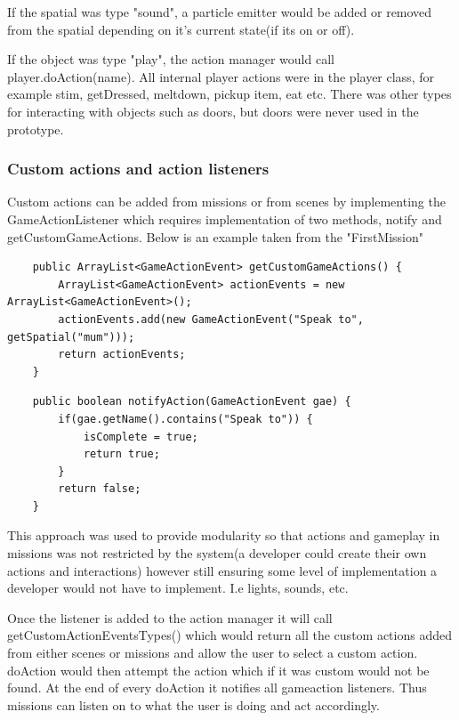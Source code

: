If the spatial was type "sound", a particle emitter would be added or removed from the spatial depending on it’s current state(if its on or off).

If the object was type "play", the action manager would call player.doAction(name). All internal player actions were in the player class, for example stim, getDressed, meltdown, pickup item, eat etc. There was other types for interacting with objects such as doors, but doors were never used in the prototype.

\subsubsection*{Custom actions and action listeners}
Custom actions can be added from missions or from scenes by implementing the GameActionListener which requires implementation of two methods, notify and getCustomGameActions. Below is an example taken from the "FirstMission"

\begin{lstlisting}
    public ArrayList<GameActionEvent> getCustomGameActions() {
        ArrayList<GameActionEvent> actionEvents = new ArrayList<GameActionEvent>();
        actionEvents.add(new GameActionEvent("Speak to", getSpatial("mum")));
        return actionEvents;
    }
\end{lstlisting}

\begin{lstlisting}
    public boolean notifyAction(GameActionEvent gae) {
        if(gae.getName().contains("Speak to")) {
            isComplete = true;
            return true;
        }
        return false;
    }
\end{lstlisting}

This approach was used to provide modularity so that actions and gameplay in missions was not restricted by the system(a developer could create their own actions and interactions) however still ensuring some level of implementation a developer would not have to implement. I.e lights, sounds, etc.

Once the listener is added to the action manager it will call getCustomActionEventsTypes() which would return all the custom actions added from either scenes or missions and allow the user to select a custom action. doAction would then attempt the action which if it was custom would not be found. At the end of every doAction it notifies all gameaction listeners. Thus missions can listen on to what the user is doing and act accordingly. 


